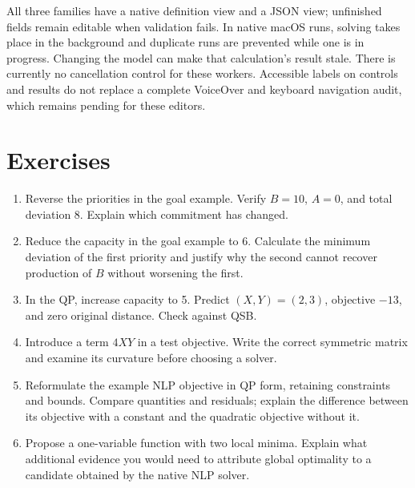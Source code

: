 All three families have a native definition view and a JSON view; unfinished
fields remain editable when validation fails. In native macOS runs, solving
takes place in the background and duplicate runs are prevented while one is
in progress. Changing the model can make that calculation's result stale.
There is currently no cancellation control for these workers. Accessible
labels on controls and results do not replace a complete VoiceOver and
keyboard navigation audit, which remains pending for these editors.

\section{Exercises}
\begin{enumerate}
 \item Reverse the priorities in the goal example. Verify \(B=10\),
 \(A=0\), and total deviation 8. Explain which commitment has changed.
 \item Reduce the capacity in the goal example to 6. Calculate the minimum
 deviation of the first priority and justify why the second cannot recover
 production of \(B\) without worsening the first.
 \item In the QP, increase capacity to 5. Predict \((X,Y)=(2,3)\),
 objective \(-13\), and zero original distance. Check against QSB.
 \item Introduce a term \(4XY\) in a test objective. Write the correct
 symmetric matrix and examine its curvature before choosing a solver.
 \item Reformulate the example NLP objective in QP form, retaining
 constraints and bounds. Compare quantities and residuals; explain the
 difference between its objective with a constant and the quadratic
 objective without it.
 \item Propose a one-variable function with two local minima. Explain what
 additional evidence you would need to attribute global optimality to a
 candidate obtained by the native NLP solver.
\end{enumerate}
